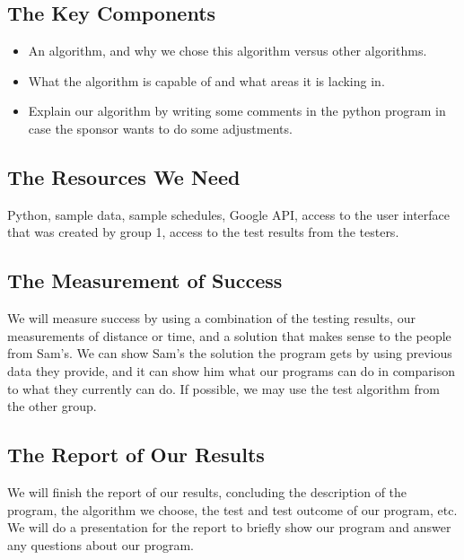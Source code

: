 \documentclass[11pt]{article}
\begin{document}
\subsection{The Key Components}
\begin{itemize}
    \item An algorithm, and why we chose this algorithm versus other algorithms.
    \item What the algorithm is capable of and what areas it is lacking in. 
    \item Explain our algorithm by writing some comments in the python program in case the sponsor wants to do some adjustments. 
\end{itemize}

\subsection{The Resources We Need}
Python, sample data, sample schedules, Google API, access to the user interface that was created by group 1, access to the test results from the testers. 

\subsection{The Measurement of Success}
We will measure success by using a combination of the testing results, our measurements of distance or time, and a solution that makes sense to the people from Sam’s. We can show Sam's the solution the program gets by using previous data they provide, and it can show him what our programs can do in comparison to what they currently can do. If possible, we may  use the test algorithm from the other group.

\subsection{The Report  of Our Results}
We will finish the report of our results, concluding the description of the program, the algorithm we choose, the test and test outcome of our program, etc.
We will do a presentation for the report to briefly show our program and answer any questions about our program.
\end{document}
